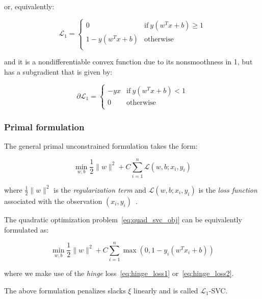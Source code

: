 or, equivalently:

\begin{equation} \label{eq:hinge_loss2}
	\mathcal{L}_1 = 
	\begin{cases}
		0 & \text{if} \ y (w^T x + b) \geq 1 \\
		1 - y (w^T x + b) & \text{otherwise} \\
	\end{cases}
\end{equation}

and it is a nondifferentiable convex function due to its nonsmoothness in 1, but has a subgradient that is given by:

\begin{equation} \label{eq:hinge_loss_der}
    \partial \mathcal{L}_1=
        \begin{cases}
            -y x & \text{if} \ y (w^T x + b) < 1 \\
            0 & \text{otherwise} \\ 
        \end{cases}
\end{equation}

\subsubsection{Primal formulation}

The general primal unconstrained formulation takes the form:

\begin{equation} \label{eq:primal_svm}
    \min_{w,b} \frac{1}{2} \| w \|^2 + C \sum_{i=1}^n \mathcal{L}(w,b;x_i,y_i)
\end{equation}

where $\displaystyle \frac{1}{2} \| w \|^2$ is the \emph{regularization term} and $\mathcal{L}(w,b;x_i,y_i)$ is the \emph{loss function} associated with the observation $(x_i,y_i)$~\cite{piccialli2018nonlinear}.

The quadratic optimization problem~\eqref{eq:quad_svc_obj} can be equivalently formulated as:

\begin{equation} \label{eq:primal_svc_hinge}
    \min_{w,b} \frac{1}{2} \| w \|^2 + C \sum_{i=1}^n \max(0, 1 - y_i (w^T x_i + b))
\end{equation}

where we make use of the \emph{hinge} loss~\eqref{eq:hinge_loss1} or~\eqref{eq:hinge_loss2}.

The above formulation penalizes slacks $\xi$ linearly and is called $\mathcal{L}_1$-SVC.

